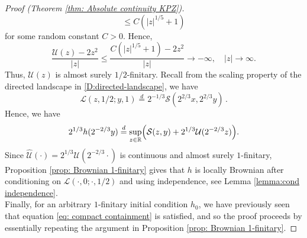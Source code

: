 \documentclass[12pt]{report}
\theoremstyle{plain}
\newcommand{\R}{\ensuremath{\mathbb{R}}}
\begin{document}
\begin{proof}[Proof (Theorem \ref{thm: Absolute continuity KPZ})]
\[    \leq C(|z|^{1/5}+1) 
    \]
    for some random constant $C>0$. Hence,
    \[
    \frac{\mathcal{U}(z)-2z^2}{|z|} \leq \frac{C(|z|^{1/5}+1)-2z^2}{|z|}\to-\infty, \quad |z|\to\infty.
    \]
    Thus, $\mathcal{U}(z)$ is almost surely $1/2$-finitary. Recall from the scaling property of the directed landscape in \ref{D:directed-landscape}, we have 
    \[
    \mathcal{L}(z,1/2;y,1) \stackrel{d}{=} 2^{-1/3}\mathcal{S}(2^{2/3}x, 2^{2/3}y)\,.
    \]
    Hence, we have 
    \[
    2^{1/3}h(2^{-2/3}y) \stackrel{d}{=}\sup_{z\in\R}\Bigl(\mathcal{S}(z,y)+2^{1/3}\mathcal{U}(2^{-2/3}z)\Bigr).
    \]
    Since $\hat{\mathcal{U}}(\cdot) = 2^{1/3}\mathcal{U}(2^{-2/3}\cdot)$ is continuous and almost surely $1$-finitary, Proposition \ref{prop: Brownian 1-finitary} gives that $h$ is locally Brownian after conditioning on $\mathcal{L}(\cdot,0;\cdot,1/2)$ and using independence, see Lemma \ref{lemma:cond independence}.\\

    Finally, for an arbitrary $1$-finitary initial condition $h_0$, we have previously seen that equation \ref{eq: compact containment} is satisfied, and so the proof proceeds by essentially repeating the argument in Proposition \ref{prop: Brownian 1-finitary}. 

\end{proof}
\end{document}
